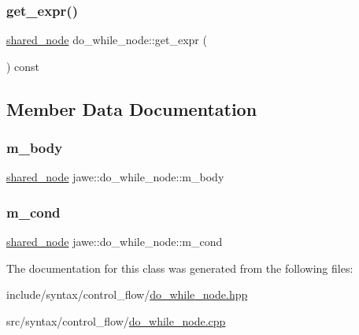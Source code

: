 \mbox{\label{classjawe_1_1do__while__node_a4b9b594ac5555ef726b9973996658392}} 
\subsubsection{\texorpdfstring{get\+\_\+expr()}{get\_expr()}}
{\footnotesize\ttfamily \hyperlink{namespacejawe_a3f307481d921b6cbb50cc8511fc2b544}{shared\+\_\+node} do\+\_\+while\+\_\+node\+::get\+\_\+expr (\begin{DoxyParamCaption}{ }\end{DoxyParamCaption}) const}



\subsection{Member Data Documentation}
\mbox{\label{classjawe_1_1do__while__node_a35de6d1c09f9bc8bfbf74c9e617111e3}} 
\subsubsection{\texorpdfstring{m\+\_\+body}{m\_body}}
{\footnotesize\ttfamily \hyperlink{namespacejawe_a3f307481d921b6cbb50cc8511fc2b544}{shared\+\_\+node} jawe\+::do\+\_\+while\+\_\+node\+::m\+\_\+body\hspace{0.3cm}{\ttfamily [private]}}

\mbox{\label{classjawe_1_1do__while__node_a9f0777b8820faf8513b523a00e6cbdd7}} 
\subsubsection{\texorpdfstring{m\+\_\+cond}{m\_cond}}
{\footnotesize\ttfamily \hyperlink{namespacejawe_a3f307481d921b6cbb50cc8511fc2b544}{shared\+\_\+node} jawe\+::do\+\_\+while\+\_\+node\+::m\+\_\+cond\hspace{0.3cm}{\ttfamily [private]}}



The documentation for this class was generated from the following files\+:\begin{DoxyCompactItemize}
\item 
include/syntax/control\+\_\+flow/\hyperlink{do__while__node_8hpp}{do\+\_\+while\+\_\+node.\+hpp}\item 
src/syntax/control\+\_\+flow/\hyperlink{do__while__node_8cpp}{do\+\_\+while\+\_\+node.\+cpp}\end{DoxyCompactItemize}

